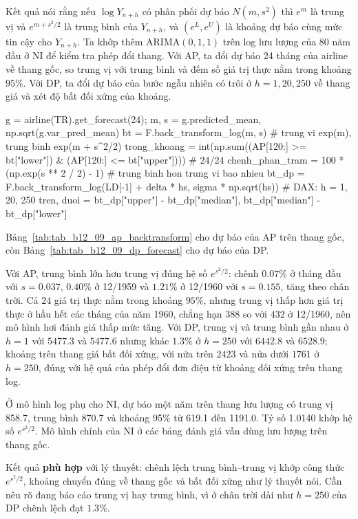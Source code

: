  Kết quả  nói rằng nếu $\log Y_{n+h}$ có phân phối dự báo $N(m,s^2)$ thì $e^m$ là trung vị và $e^{m+s^2/2}$ là trung bình của $Y_{n+h}$, và $(e^L,e^U)$ là khoảng dự báo cùng mức tin cậy cho $Y_{n+h}$.
 Ta khớp thêm ARIMA$(0,1,1)$ trên log lưu lượng của 80 năm đầu ở NI để kiểm tra phép đổi thang. Với AP, ta đổi dự báo 24 tháng của airline về thang gốc, so trung vị với trung bình và đếm số giá trị thực nằm trong khoảng $95\%$. Với DP, ta đổi dự báo của bước ngẫu nhiên có trôi ở $h=1,20,250$ về thang giá và xét độ bất đối xứng của khoảng.
\begin{codeblock}
g = airline(TR).get_forecast(24); m, s = g.predicted_mean, np.sqrt(g.var_pred_mean)
bt = F.back_transform_log(m, s)               # trung vi exp(m), trung binh exp(m + s^2/2)
trong_khoang = int(np.sum((AP[120:] >= bt["lower"]) & (AP[120:] <= bt["upper"])))   # 24/24
chenh_phan_tram = 100 * (np.exp(s ** 2 / 2) - 1)     # trung binh hon trung vi bao nhieu %
bt_dp = F.back_transform_log(LD[-1] + delta * hs, sigma * np.sqrt(hs))   # DAX: h = 1, 20, 250
tren, duoi = bt_dp["upper"] - bt_dp["median"], bt_dp["median"] - bt_dp["lower"]
\end{codeblock}
 Bảng~\ref{tab:tab_b12_09_ap_backtransform} cho dự báo của AP trên thang gốc, còn Bảng~\ref{tab:tab_b12_09_dp_forecast} cho dự báo của DP.


 Với AP, trung bình lớn hơn trung vị đúng hệ số $e^{s^2/2}$: chênh $0.07\%$ ở tháng đầu với $s=0.037$, $0.40\%$ ở 12/1959 và $1.21\%$ ở 12/1960 với $s=0.155$, tăng theo chân trời. Cả $24$ giá trị thực nằm trong khoảng $95\%$, nhưng trung vị thấp hơn giá trị thực ở hầu hết các tháng của năm 1960, chẳng hạn $388$ so với $432$ ở 12/1960, nên mô hình hơi đánh giá thấp mức tăng. Với DP, trung vị và trung bình gần nhau ở $h=1$ với $5477.3$ và $5477.6$ nhưng khác $1.3\%$ ở $h=250$ với $6442.8$ và $6528.9$; khoảng trên thang giá bất đối xứng, với nửa trên $2423$ và nửa dưới $1761$ ở $h=250$, đúng với hệ quả của phép đổi đơn điệu từ khoảng đối xứng trên thang log.

Ở mô hình log phụ cho NI, dự báo một năm trên thang lưu lượng có trung vị 858.7, trung bình 870.7 và khoảng 95\% từ 619.1 đến 1191.0. Tỷ số 1.0140 khớp hệ số $e^{s^2/2}$. Mô hình chính của NI ở các bảng đánh giá vẫn dùng lưu lượng trên thang gốc.

 Kết quả \textbf{phù hợp} với lý thuyết: chênh lệch trung bình--trung vị khớp công thức $e^{s^2/2}$, khoảng chuyển đúng về thang gốc và bất đối xứng như lý thuyết nói. Cần nêu rõ đang báo cáo trung vị hay trung bình, vì ở chân trời dài như $h=250$ của DP chênh lệch đạt $1.3\%$.

